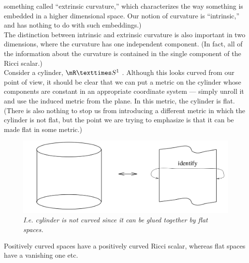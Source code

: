 something called “extrinsic curvature,” which characterizes the way something is embedded
in a higher dimensional space. Our notion of curvature is “intrinsic,” and has nothing to do
with such embeddings.)\\
The distinction between intrinsic and extrinsic curvature is also important in two dimensions, where the curvature has one independent component. (In fact, all of the information about the curvature is contained in the single component of the Ricci scalar.)\\
Consider a
cylinder, $\mR × S^1$ . Although this looks curved from our point of view, it should be clear
that we can put a metric on the cylinder whose components are constant in an appropriate
coordinate system — simply unroll it and use the induced metric from the plane. In this
metric, the cylinder is flat. (There is also nothing to stop us from introducing a different
metric in which the cylinder is not flat, but the point we are trying to emphasize is that it
can be made flat in some metric.)
\begin{figure}[h!]
	\centering
	\includegraphics[width=0.7\linewidth]{gfx/CurvatureCylinder}
	\caption{\itshape I.e. cylinder is not curved since it can be glued together by flat spaces.}
	\label{fig:curvaturecylinder}
\end{figure}
Positively curved spaces have a positively curved Ricci scalar, whereas flat spaces have a vanishing one etc.


